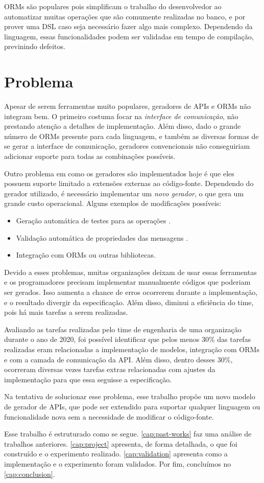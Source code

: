 ORMs são populares pois simplificam o trabalho do desenvolvedor ao automatizar muitas
operações que são comumente realizadas no banco, e por prover uma DSL caso seja
necessário fazer algo mais complexo. Dependendo da linguagem, essas funcionalidades
podem ser validadas em tempo de compilação, previnindo defeitos.

\section{Problema}

Apesar de serem ferramentas muito populares, geradores de APIs e ORMs não integram
bem. O primeiro costuma focar na \textit{interface de comunicação}, não prestando
atenção a detalhes de implementação. Além disso, dado o grande número de ORMs
presente para cada linguagem, e também as diversas formas de se gerar a interface
de comunicação, geradores convencionais não conseguiriam adicionar suporte para
todas as combinações possíveis.

Outro problema em como os geradores são implementados hoje é que eles possuem
suporte limitado a extensões externas ao código-fonte. Dependendo do gerador
utilizado, é necessário implementar um \textit{novo gerador}, o que gera um grande
custo operacional. Alguns exemplos de modificações possíveis:

\begin{itemize}
\item
  Geração automática de testes para as operações \cite{9159071}.
\item
  Validação automática de propriedades das mensagens \cite{envoy:protoc-gen-validate}.
\item
  Integração com ORMs ou outras bibliotecas.
\end{itemize}

Devido a esses problemas, muitas organizações deixam de usar essas ferramentas e os
programadores precisam implementar manualmente códigos que poderiam ser gerados.
Isso aumenta a chance de erros ocorrerem durante a implementação, e o resultado divergir
da especificação. Além disso, diminui a eficiência do time, pois há mais tarefas a
serem realizadas.

Avaliando as tarefas realizadas pelo time de engenharia de uma organização durante o
ano de 2020, foi possível identificar que pelos menos 30\% das tarefas realizadas
eram relacionadas a implementação de modelos, integração com ORMs e com a camada
de comunicação da API. Além disso, dentro desses 30\%, ocorreram diversas vezes tarefas
extras relacionadas com ajustes da implementação para que essa seguisse a especificação.

Na tentativa de solucionar esse problema, esse trabalho propõe um novo modelo de
gerador de APIs, que pode ser extendido para suportar qualquer linguagem ou funcionalidade
nova sem a necessidade de modificar o código-fonte.

Esse trabalho é estruturado como se segue. \cref{cap:past-works} faz uma análise de
trabalhos anteriores. \cref{cap:project} apresenta, de forma detalhada, o que foi
construído e o experimento realizado. \cref{cap:validation} apresenta como a implementação
e o experimento foram validados. Por fim, concluímos no \cref{cap:conclusion}.
